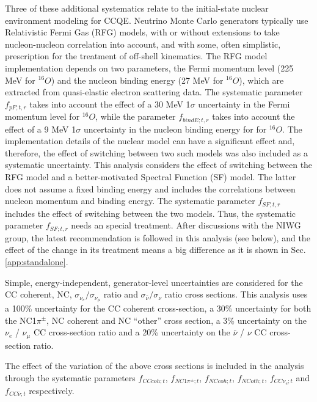 \begin{enumerate}
Three of these additional systematics relate to the initial-state nuclear environment modeling for CCQE.
Neutrino Monte Carlo generators typically use Relativistic Fermi Gas (RFG) models,
with or without extensions to take nucleon-nucleon correlation into account, 
and with some, often simplistic, prescription for the treatment of off-shell kinematics.
The RFG model implementation depends on two parameters, the Fermi momentum level (225 MeV for $^{16}O$)
and the nucleon binding energy (27 MeV for $^{16}O$), which are extracted from quasi-elastic electron scattering data.
The systematic parameter $f_{pF; t, r}$ takes into account the effect of a 30 MeV 1$\sigma$ uncertainty in the Fermi momentum level
for $^{16}O$, while the parameter $f_{bindE; t, r}$ takes into account the effect of a 9 MeV 1$\sigma$ uncertainty in the nucleon 
binding energy for for $^{16}O$.
The implementation details of the nuclear model can have a significant effect and, therefore,
the effect of switching between two such models was also included as a systematic uncertainty.
This analysis considers the effect of switching between the RFG model and a better-motivated 
Spectral Function (SF) model. The latter does not assume a fixed binding energy and includes the 
correlations between nucleon momentum and binding energy. The systematic parameter $f_{SF; t, r}$ 
includes the effect of switching between the two models.
Thus, the systematic parameter $f_{SF; t, r}$  needs an special treatment. After discussions with 
the NIWG group, the latest recommendation is followed in this analysis (see below), and the effect
of the change in its treatment means a big difference as it is shown in Sec. \ref{app:standalone}.


Simple, energy-independent, generator-level uncertainties are considered for the CC coherent, NC, $\sigma_{\nu_{e}}/\sigma_{\nu_{\mu}}$ ratio and $\sigma_{\bar{\nu}}/\sigma_{\nu}$ ratio cross sections.
This analysis uses a 100\% uncertainty for the CC coherent cross-section, 
a 30\% uncertainty for both the NC1$\pi^\pm$, NC coherent and NC ``other''  cross section,
a 3\% uncertainty on the $\nu_e$ / $\nu_\mu$ CC cross-section ratio and 
a 20\% uncertainty on the $\bar{\nu}$ / $\nu$ CC cross-section ratio.

The effect of the variation of the above cross sections is included in the analysis
through the systematic parameters $f_{CCcoh; t}$, $f_{NC1\pi^\pm; t}$, $f_{NCcoh; t}$, $f_{NCoth; t}$,
$f_{CC\nu_e; t}$ and $f_{CC\bar{\nu}; t}$ respectively.


\end{enumerate}
